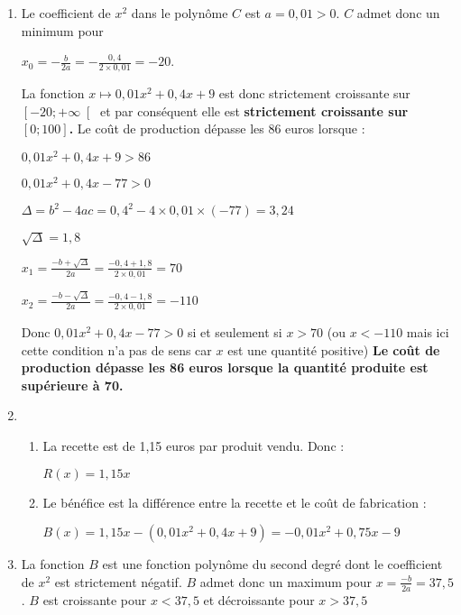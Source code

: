 \begin{corrige}
     \begin{enumerate}
          \item
          Le coefficient de $x^{2}$ dans le polynôme $C$ est $a=0,01 > 0$. $C$ admet donc un minimum pour
          \par
          $x_{0}=-\frac{b}{2a}=-\frac{0,4}{2\times 0,01}=-20$.
          \par
          La fonction $x \mapsto 0,01x^{2}+0,4x+9$ est donc strictement croissante sur $\left[-20 ; +\infty \right[$ et par conséquent elle est \textbf{strictement croissante sur $\left[0 ; 100\right]$.
          }
          Le coût de production dépasse les 86 euros lorsque :
          \par
          $0,01x^{2}+0,4x+9 > 86$
          \par
          $0,01x^{2}+0,4x-77 > 0$
          \par
          $\Delta = b^{2}-4ac = 0,4^{2}-4\times 0,01\times \left(-77\right) = 3,24$
          \par
          $\sqrt{\Delta }=1,8$
          \par
          $x_{1} = \frac{-b+\sqrt{\Delta }}{2a} = \frac{-0,4+1,8}{2\times 0,01} = 70$
          \par
          $x_{2} = \frac{-b-\sqrt{\Delta }}{2a} = \frac{-0,4-1,8}{2\times 0,01} = -110$
          \par
          Donc $0,01x^{2}+0,4x-77 > 0$ si et seulement si $x > 70$ (ou $x < -110$ mais ici cette condition n'a pas de sens car $x$ est une quantité positive)
          \textbf{Le coût de production dépasse les 86 euros lorsque la quantité produite est supérieure à 70.}
          \item
          \begin{enumerate}[label=\alph*.]
               \item
               La recette est de 1,15 euros par produit vendu. Donc :
               \par
               $R\left(x\right)=1,15x$
               \item
               Le bénéfice est la différence entre la recette et le coût de fabrication :
               \par
               $B\left(x\right)=1,15x-\left(0,01x^{2}+0,4x+9\right)=-0,01x^{2}+0,75x-9$
          \end{enumerate}
          \item
          La fonction $B$ est une fonction polynôme du second degré dont le coefficient de $x^{2}$ est strictement négatif. $B$ admet donc un maximum pour $x=\frac{-b}{2a}=37,5$ . $B$ est croissante pour $x < 37,5$ et décroissante pour $x > 37,5$

\end{enumerate}
\end{corrige}
